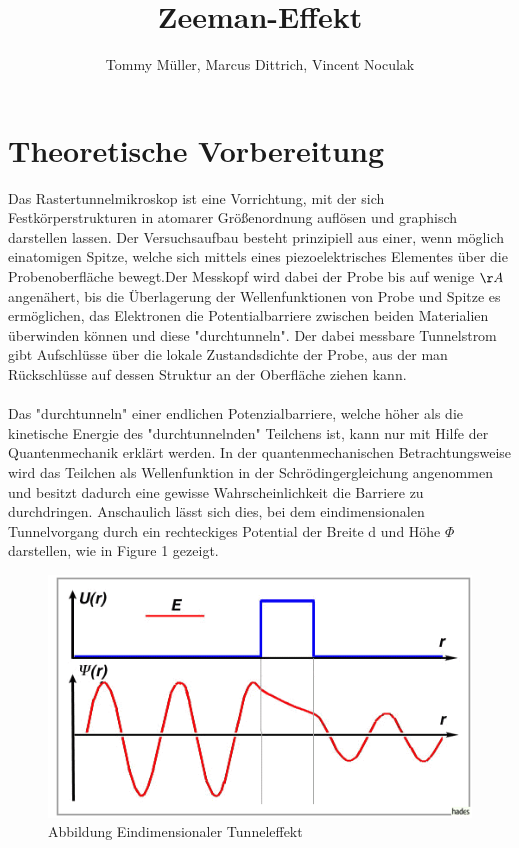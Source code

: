 \documentclass[10pt,a4paper]{article}
\author{Tommy Müller, Marcus Dittrich, Vincent Noculak}
\title{Zeeman-Effekt}
\begin{document}
\maketitle
\newpage
\newpage

\section{ Theoretische Vorbereitung}

Das Rastertunnelmikroskop ist eine Vorrichtung, mit der sich Festkörperstrukturen in atomarer Größenordnung auflösen und graphisch darstellen lassen. Der Versuchsaufbau besteht prinzipiell aus einer, wenn möglich einatomigen Spitze, welche sich mittels eines piezoelektrisches Elementes über die Probenoberfläche bewegt.Der Messkopf wird dabei der Probe bis auf wenige $\AA$ angenähert, bis die Überlagerung der Wellenfunktionen von Probe und Spitze es ermöglichen, das Elektronen die Potentialbarriere zwischen beiden Materialien überwinden können und diese "durchtunneln". Der dabei messbare Tunnelstrom gibt Aufschlüsse über die lokale Zustandsdichte der Probe, aus der man Rückschlüsse auf dessen Struktur an der Oberfläche ziehen kann. \\ \\Das "durchtunneln" einer endlichen Potenzialbarriere, welche höher als die kinetische Energie des "durchtunnelnden" Teilchens ist, kann nur mit Hilfe der Quantenmechanik erklärt werden. In der quantenmechanischen Betrachtungsweise wird das Teilchen als Wellenfunktion in der Schrödingergleichung angenommen und besitzt dadurch eine gewisse Wahrscheinlichkeit die Barriere zu durchdringen. Anschaulich lässt sich dies, bei dem eindimensionalen Tunnelvorgang durch ein rechteckiges Potential der Breite d und Höhe $\Phi$ darstellen, wie in Figure 1 gezeigt.
\begin{figure}[h]
	\includegraphics[scale = 0.8]{tunnel.png}
	\centering
	\caption{Abbildung Eindimensionaler Tunneleffekt}
	\label{diagramm_aufspaltung}
\end{figure}
\end{document}
